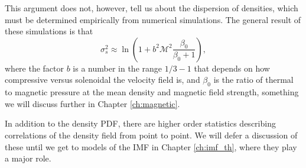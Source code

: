 This argument does not, however, tell us about the dispersion of densities, which must be determined empirically from numerical simulations. The general result of these simulations \citep[e.g.,][]{federrath13b} is that
\begin{equation}
\sigma_s^2 \approx \ln \left(1 + b^2 \mathcal{M}^2 \frac{\beta_0}{\beta_0+1}\right),
\end{equation}
where the factor $b$ is a number in the range $1/3-1$ that depends on how compressive versus solenoidal the velocity field is, and $\beta_0$ is the ratio of thermal to magnetic pressure at the mean density and magnetic field strength, something we will discuss further in Chapter \ref{ch:magnetic}.

In addition to the density PDF, there are higher order statistics describing correlations of the density field from point to point. We will defer a discussion of these until we get to models of the IMF in Chapter \ref{ch:imf_th}, where they play a major role.

